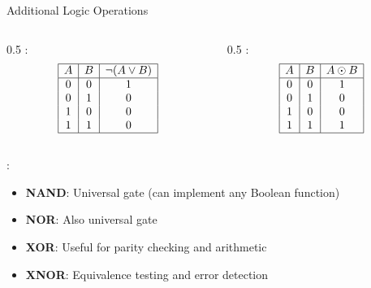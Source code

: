 \begin{frame}{Additional Logic Operations}
\begin{columns}
\begin{column}{0.5\textwidth}
:
\[
\begin{array}{|c|c|c|}
\hline
A & B & \neg(A \lor B) \\
\hline
0 & 0 & 1 \\
0 & 1 & 0 \\
1 & 0 & 0 \\
1 & 1 & 0 \\
\hline
\end{array}
\]
\end{column}
\begin{column}{0.5\textwidth}
:
\[
\begin{array}{|c|c|c|}
\hline
A & B & A \odot B \\
\hline
0 & 0 & 1 \\
0 & 1 & 0 \\
1 & 0 & 0 \\
1 & 1 & 1 \\
\hline
\end{array}
\]
\end{column}
\end{columns}

\vspace{0.5cm}
:
\begin{itemize}
\item \textbf{NAND}: Universal gate (can implement any Boolean function)
\item \textbf{NOR}: Also universal gate
\item \textbf{XOR}: Useful for parity checking and arithmetic
\item \textbf{XNOR}: Equivalence testing and error detection
\end{itemize}
\end{frame}

